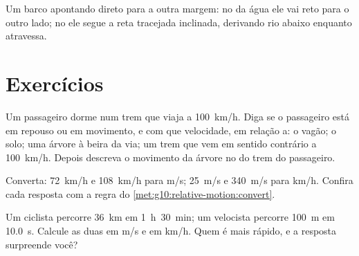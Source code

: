 \begin{omfigure}

{\small Um barco apontando direto para a outra margem: no  da
água ele vai reto para o outro lado; no  ele segue a
reta tracejada inclinada, derivando rio abaixo enquanto atravessa.}
\end{omfigure}

\section{Exercícios}

\begin{exercise}[$\star$]\label{exo:g10:relative-motion:1}
Um passageiro dorme num trem que viaja a \qty{100}{km/h}. Diga se o
passageiro está em repouso ou em movimento, e com que velocidade, em
relação a: o vagão; o solo; uma árvore à beira da via; um trem que vem em
sentido contrário a \qty{100}{km/h}. Depois descreva o movimento da
árvore no  do trem do passageiro.
\end{exercise}

\begin{exercise}[$\star$]\label{exo:g10:relative-motion:2}
Converta: \qty{72}{km/h} e \qty{108}{km/h} para \unit{m/s};
\qty{25}{m/s} e \qty{340}{m/s} para \unit{km/h}. Confira cada resposta com
a regra do \cref{met:g10:relative-motion:convert}.
\end{exercise}

\begin{exercise}[$\star$]\label{exo:g10:relative-motion:3}
Um ciclista percorre \qty{36}{km} em \qty{1}{h}~\qty{30}{min}; um
velocista percorre \qty{100}{m} em \qty{10.0}{s}. Calcule as duas
 em \unit{m/s} e em \unit{km/h}. Quem é mais rápido, e a
resposta surpreende você?
\end{exercise}

